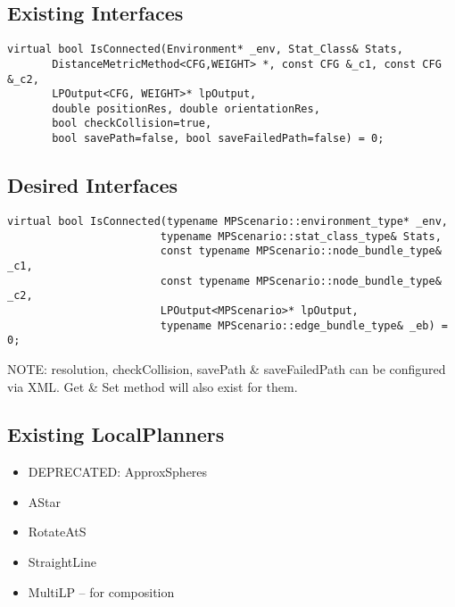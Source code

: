 \subsection{Existing Interfaces}
\begin{lstlisting}
virtual bool IsConnected(Environment* _env, Stat_Class& Stats, 
       DistanceMetricMethod<CFG,WEIGHT> *, const CFG &_c1, const CFG &_c2, 
       LPOutput<CFG, WEIGHT>* lpOutput,
       double positionRes, double orientationRes,
       bool checkCollision=true, 
       bool savePath=false, bool saveFailedPath=false) = 0;
\end{lstlisting}
\subsection{Desired Interfaces}
\begin{lstlisting}
virtual bool IsConnected(typename MPScenario::environment_type* _env, 
                        typename MPScenario::stat_class_type& Stats, 
                        const typename MPScenario::node_bundle_type& _c1, 
                        const typename MPScenario::node_bundle_type& _c2, 
                        LPOutput<MPScenario>* lpOutput,
                        typename MPScenario::edge_bundle_type& _eb) = 0;
\end{lstlisting}

NOTE: resolution, checkCollision, savePath \& saveFailedPath can be configured
via XML.  Get \& Set method will also exist for them.

\subsection{Existing LocalPlanners}
\begin{itemize}
\item DEPRECATED: ApproxSpheres
\item AStar
\item RotateAtS
\item StraightLine
\item MultiLP -- for composition
\end{itemize}